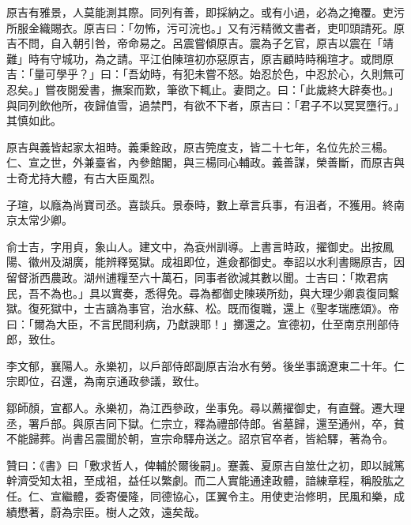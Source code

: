 \begin{pinyinscope}
原吉有雅景，人莫能測其際。同列有善，即採納之。或有小過，必為之掩覆。吏污所服金織賜衣。原吉曰：「勿怖，污可浣也。」又有污精微文書者，吏叩頭請死。原吉不問，自入朝引咎，帝命易之。呂震嘗傾原吉。震為子乞官，原吉以震在「靖難」時有守城功，為之請。平江伯陳瑄初亦惡原吉，原吉顧時時稱瑄才。或問原吉：「量可學乎？」曰：「吾幼時，有犯未嘗不怒。始忍於色，中忍於心，久則無可忍矣。」嘗夜閱爰書，撫案而歎，筆欲下輒止。妻問之。曰：「此歲終大辟奏也。」與同列飲他所，夜歸值雪，過禁門，有欲不下者，原吉曰：「君子不以冥冥墮行。」其慎如此。

原吉與義皆起家太祖時。義秉銓政，原吉筦度支，皆二十七年，名位先於三楊。仁、宣之世，外兼臺省，內參館閣，與三楊同心輔政。義善謀，榮善斷，而原吉與士奇尤持大體，有古大臣風烈。

子瑄，以廕為尚寶司丞。喜談兵。景泰時，數上章言兵事，有沮者，不獲用。終南京太常少卿。

俞士吉，字用貞，象山人。建文中，為袞州訓導。上書言時政，擢御史。出按鳳陽、徽州及湖廣，能辨釋冤獄。成祖即位，進僉都御史。奉詔以水利書賜原吉，因留督浙西農政。湖州逋糧至六十萬石，同事者欲減其數以聞。士吉曰：「欺君病民，吾不為也。」具以實奏，悉得免。尋為都御史陳瑛所劾，與大理少卿袁復同繫獄。復死獄中，士吉謫為事官，治水蘇、松。既而復職，還上《聖孝瑞應頌》。帝曰：「爾為大臣，不言民間利病，乃獻諛耶！」擲還之。宣德初，仕至南京刑部侍郎，致仕。

李文郁，襄陽人。永樂初，以戶部侍郎副原吉治水有勞。後坐事謫遼東二十年。仁宗即位，召還，為南京通政參議，致仕。

鄒師顏，宣都人。永樂初，為江西參政，坐事免。尋以薦擢御史，有直聲。遷大理丞，署戶部。與原吉同下獄。仁宗立，釋為禮部侍郎。省墓歸，還至通州，卒，貧不能歸葬。尚書呂震聞於朝，宣宗命驛舟送之。詔京官卒者，皆給驛，著為令。

贊曰：《書》曰「敷求哲人，俾輔於爾後嗣」。蹇義、夏原吉自筮仕之初，即以誠篤幹濟受知太祖，至成祖，益任以繁劇。而二人實能通達政體，諳練章程，稱股肱之任。仁、宣繼體，委寄優隆，同德協心，匡翼令主。用使吏治修明，民風和樂，成績懋著，蔚為宗臣。樹人之效，遠矣哉。


\end{pinyinscope}